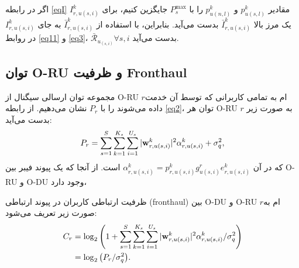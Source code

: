 اگر در رابطه \eqref{eqI} مقادیر $p_{u(s,l)}^{k}$ و $p_{u(n,l)}^{k}$ را با $P_{s}^{\text{max}}$ جایگزین کنیم، برای $I_{r,u(s,i)}^{k}$ یک مرز بالا $\bar{I}_{r,u(s,i)}^{k}$ بدست می‌آید. بنابراین، با استفاده از $\bar{I}_{r,u(s,i)}^{k}$ به جای $I_{r,u(s,i)}^{k}$ در روابط \eqref{eq11} و \eqref{eq3}، $\bar{\mathcal{R}}_{u_{(s,i)}} \forall s , i$ بدست می‌آید.

\subsection{توان O-RU و ظرفیت Fronthaul}
مجموعه توان ارسالی سیگنال از O-RU $r$ام به تمامی کاربرانی که توسط آن خدمت داده می‌شوند را با $P_r$ نشان می‌دهیم. از رابطه \eqref{eq2}، توان هر O-RU $r$ به صورت زیر بدست می‌آید:
\begin{equation}\label{pr}
	P_r = \sum_{s=1}^{S}\sum_{k=1}^{K_s}\sum_{i=1}^{U_s}|\bold{w}_{r,u(s,i)}^{k}|^2\alpha^k_{r,u(s,i)} + \sigma_{q}^2,
\end{equation}
که در آن $\alpha^k_{r,u(s,i)}= p_{r,u(s,i)}^{k} g_{u(s,i)}^r e^k_{r,u(s,i)}$ است.
از آنجا که یک پیوند فیبر بین O-RU و O-DU وجود دارد،

ظرفیت ارتباطی کاربران در پیوند ارتباطی (fronthaul) بین O-DU و O-RU $r$ام به صورت زیر تعریف می‌شود:
\begin{align}\label{cr}
	C_{r} &= \log_2{\left(1+ \sum_{s=1}^{S}\sum_{k=1}^{K_s}\sum_{i=1}^{U_s}|\bold{w}_{r,u(s,i)}^{k}|^2 \mathcal{\alpha}^k_{r,u(s,i)} / \sigma_{q}^2\right)}\nonumber\\
	&= \log_2{\left(P_r/\sigma_{q}^2\right)}.
\end{align}

